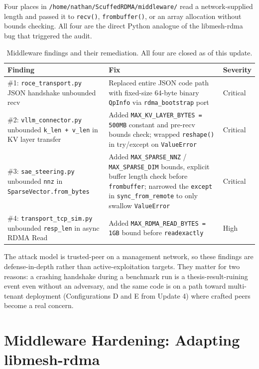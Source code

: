 \documentclass[11pt]{article}
\begin{document}
Four places in \texttt{/home/nathan/ScuffedRDMA/middleware/} read a
network-supplied length and passed it to \texttt{recv()},
\texttt{frombuffer()}, or an array allocation without bounds checking.
All four are the direct Python analogue of the libmesh-rdma bug that
triggered the audit.

\begin{table}[h]
\centering\small
\begin{tabular}{@{}p{4.5cm}p{7cm}p{3cm}@{}}
\toprule
\textbf{Finding} & \textbf{Fix} & \textbf{Severity} \\
\midrule
\#1: \texttt{roce\_transport.py} JSON handshake unbounded recv &
Replaced entire JSON code path with fixed-size 64-byte binary
\texttt{QpInfo} via \texttt{rdma\_bootstrap} port &
Critical \\
\addlinespace
\#2: \texttt{vllm\_connector.py} unbounded \texttt{k\_len + v\_len} in
KV layer transfer &
Added \texttt{MAX\_KV\_LAYER\_BYTES = 500MB} constant and pre-recv
bounds check; wrapped \texttt{reshape()} in try/except on
\texttt{ValueError} &
Critical \\
\addlinespace
\#3: \texttt{sae\_steering.py} unbounded \texttt{nnz} in
\texttt{SparseVector.from\_bytes} &
Added \texttt{MAX\_SPARSE\_NNZ} / \texttt{MAX\_SPARSE\_DIM} bounds,
explicit buffer length check before \texttt{frombuffer}; narrowed the
\texttt{except} in \texttt{sync\_from\_remote} to only swallow
\texttt{ValueError} &
Critical \\
\addlinespace
\#4: \texttt{transport\_tcp\_sim.py} unbounded \texttt{resp\_len} in
async RDMA Read &
Added \texttt{MAX\_RDMA\_READ\_BYTES = 1GB} bound before
\texttt{readexactly} &
High \\
\bottomrule
\end{tabular}
\caption{Middleware findings and their remediation. All four are
  closed as of this update.}
\label{tab:sec_findings}
\end{table}

The attack model is trusted-peer on a management network, so these
findings are defense-in-depth rather than active-exploitation targets.
They matter for two reasons: a crashing handshake during a benchmark
run is a thesis-result-ruining event even without an adversary, and
the same code is on a path toward multi-tenant deployment
(Configurations D and E from Update 4) where crafted peers become a
real concern.

\section{Middleware Hardening: Adapting libmesh-rdma}
\end{document}
